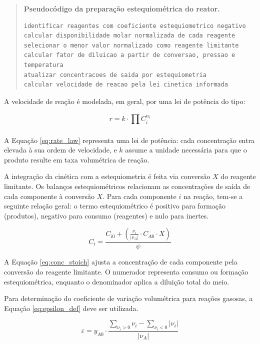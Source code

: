 \begin{quote}
\small
\textbf{Pseudocódigo da preparação estequiométrica do reator.}
\begin{verbatim}
identificar reagentes com coeficiente estequiometrico negativo
calcular disponibilidade molar normalizada de cada reagente
selecionar o menor valor normalizado como reagente limitante
calcular fator de diluicao a partir de conversao, pressao e temperatura
atualizar concentracoes de saida por estequiometria
calcular velocidade de reacao pela lei cinetica informada
\end{verbatim}
\end{quote}

A velocidade de reação é modelada, em geral, por uma lei de potência do tipo:

\begin{equation}
r = k \cdot \prod_{}^{} C_{i}^{n_{i}}
\label{eq:rate_law}
\end{equation}

A Equação \ref{eq:rate_law} representa uma lei de potência: cada concentração entra elevada à sua ordem de velocidade, e $k$ assume a unidade necessária para que o produto resulte em taxa volumétrica de reação.

A integração da cinética com a estequiometria é feita via conversão $X$ do reagente limitante. Os balanços estequiométricos relacionam as concentrações de saída de cada componente à conversão $X$. Para cada componente $i$ na reação, tem-se a seguinte relação geral: o termo estequiométrico é positivo para formação (produtos), negativo para consumo (reagentes) e nulo para inertes.

\begin{equation}
C_{i} = \frac{C_{i0} + \left( \frac{\nu_i}{|\nu_A|} \cdot C_{A0} \cdot X \right)}{\psi}
\label{eq:conc_stoich}
\end{equation}

A Equação \ref{eq:conc_stoich} ajusta a concentração de cada componente pela conversão do reagente limitante. O numerador representa consumo ou formação estequiométrica, enquanto o denominador aplica a diluição total do meio.

Para determinação do coeficiente de variação volumétrica para reações gasosas, a Equação \ref{eq:epsilon_def} deve ser utilizada.

\begin{equation}
\varepsilon = y_{A0} \cdot \frac{\sum_{\nu_i>0} \nu_i - \sum_{\nu_i<0} |\nu_i|}{|\nu_{A}|}
\label{eq:epsilon_def}
\end{equation}

